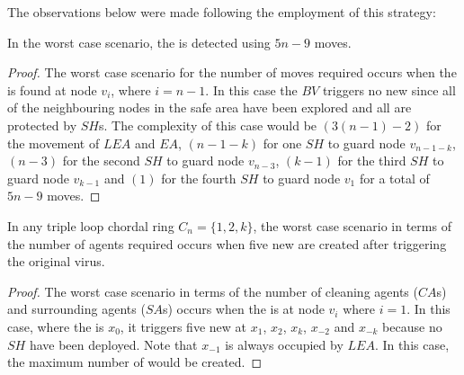 \noindent The observations below were made following the employment of this strategy:

\begin{theorem}
In the worst case scenario, the \bv is detected using $5n-9$ moves.
 
\end{theorem}
\begin{proof}
The worst case scenario for the number of moves required occurs when the \bv  is found at node $v_i$, where $i=n-1$. 
  In this case the $BV$ triggers no new \bvs since all  of the neighbouring nodes in the safe area have been explored and all are protected by $SH$s.
% 
 The complexity of this case would be $(3(n-1)-2)$ for the movement of $LEA$ and $EA$, $(n-1-k)$ for one $SH$ to guard node $v_{n-1-k}$, $(n-3)$ for the second $SH$ to guard node $v_{n-3}$, $(k-1)$ for the third $SH$ to guard node $v_{k-1}$ and $(1)$ for the fourth $SH$ to guard node $v_{1}$ for a total of $5n-9$ moves.
\end{proof}
\begin{theorem}
In any triple loop chordal ring $C_n=\{1,2,k\}$, the worst case scenario in terms of the number of agents required occurs when five new \bvs are created after triggering the original virus.
\end{theorem}
\begin{proof}
The worst case scenario in terms of the number of cleaning agents ($CA$s) and surrounding agents ($SA$s) occurs when the \bv is at node $v_i$ where $ i =1$. In this case, where the \bv is $x_0$, it  triggers five new \bvs at $x_1$, $x_2$, $x_k$, $x_{-2}$ and $x_{-k}$ because no $SH$ have been deployed. Note that  $x_{-1} $ is always occupied by $LEA$. In this case, the maximum number of  \bvs would be created.
\end{proof}




